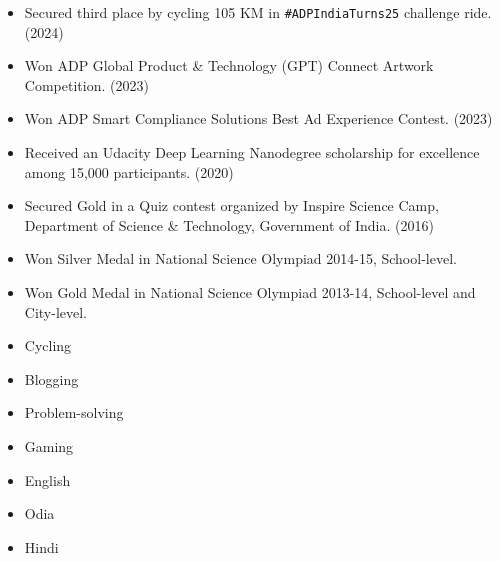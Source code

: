 \documentclass[9pt]{util} %
\begin{document}
\vspace{-10 pt}

\begin{minipage}[t]{0.725\textwidth}
	\vspace{-6pt}
    \begin{itemize}[noitemsep,topsep=0pt,parsep=0pt,partopsep=0pt, leftmargin=-1pt]
    \item Secured third place by cycling 105 KM in \texttt{\#ADPIndiaTurns25} challenge ride. (2024)
    \item Won ADP Global Product \& Technology (GPT) Connect Artwork Competition. (2023)
    \item Won ADP Smart Compliance Solutions Best Ad Experience Contest. (2023)
    \item Received an Udacity Deep Learning Nanodegree scholarship for excellence among 15,000 participants. (2020)
    \item Secured Gold in a Quiz contest organized by Inspire Science Camp, Department of Science \& Technology, Government of India. (2016)
    \item Won Silver Medal in National Science Olympiad 2014-15, School-level.
    \item Won Gold Medal in National Science Olympiad 2013-14, School-level and City-level.
    \end{itemize}
\end{minipage}
\hfill
\begin{minipage}[t]{0.225\textwidth}
    \begin{minipage}[t]{1\textwidth}
    	\vspace{-6pt}
        \begin{itemize}[noitemsep,topsep=0pt,parsep=0pt,partopsep=0pt, leftmargin=-1pt]
        \item Cycling
        \item Blogging
        \item Problem-solving
        \item Gaming
        \end{itemize}
    \end{minipage}
    \begin{minipage}[t]{1\textwidth}
    	\vspace{-6pt}
    	\begin{itemize}[noitemsep,topsep=0pt,parsep=0pt,partopsep=0pt, leftmargin=-1pt]
        \item English
        \item Odia
        \item Hindi
        \end{itemize}
    \end{minipage}
\end{minipage}
\end{document}
